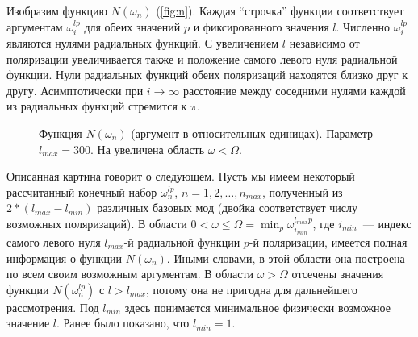     Изобразим функцию $N(\omega_n)$ (\autoref{fig:n}). Каждая \enquote{строчка} функции соответствует аргументам $\omega^{lp}_i$ для обеих значений $p$ и фиксированного значения $l$. Численно $\omega^{lp}_i$ являются нулями радиальных функций. С увеличением $l$ независимо от поляризации увеличивается также и положение самого левого нуля радиальной функции. Нули радиальных функций обеих поляризаций находятся близко друг к другу. Асимптотически при $i \to \infty$ расстояние между соседними нулями каждой из радиальных функций стремится к $\pi$.
    \begin{figure}[h]
        \centering
        \subfloat[][]{%
            \label{fig:n_all}%
            \texttt{[image: n]}}%
        \hspace{8pt}%
        \hspace{8pt}%
        \caption[]{Функция $N(\omega_n)$ (аргумент в относительных единицах). Параметр $l_{max} = 300$. На  увеличена область $\omega < \Omega$. %
        } %
        \label{fig:n}%
    \end{figure}

    Описанная картина говорит о следующем. Пусть мы имеем некоторый рассчитанный конечный набор $\omega^{lp}_n$, $n = 1, 2, \dots, n_{max}$, полученный из $2 * (l_{max} - l_{min})$ различных базовых мод (двойка соответствует числу возможных поляризаций). В области $0 < \omega \le \Omega = \min_p{\omega^{l_{max}p}_{i_{min}}}$, где $i_{min}$~--- индекс самого левого нуля $l_{max}$-й радиальной функции $p$-й поляризации, имеется полная информация о функции $N(\omega_n)$. Иными словами, в этой области она построена по всем своим возможным аргументам. В области $\omega > \Omega$ отсечены значения функции $N(\omega^{lp}_n)$ с $l > l_{max}$, потому она не пригодна для дальнейшего рассмотрения. Под $l_{min}$ здесь понимается минимальное физически возможное значение $l$. Ранее было показано, что $l_{min} = 1$.

